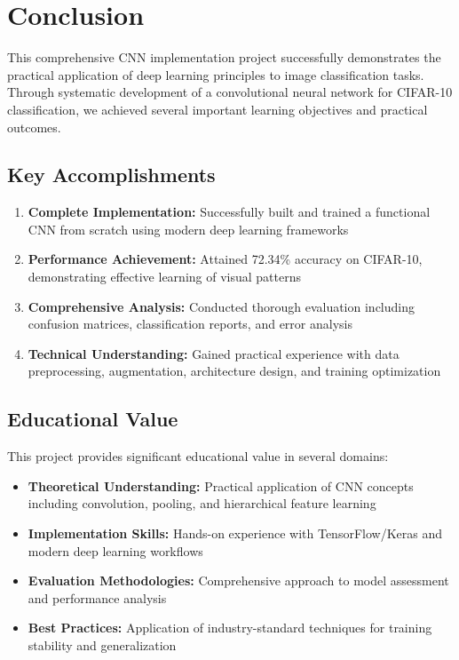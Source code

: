 \documentclass[11pt,a4paper]{article}
\begin{document}
\section{Conclusion}

This comprehensive CNN implementation project successfully demonstrates the practical application of deep learning principles to image classification tasks. Through systematic development of a convolutional neural network for CIFAR-10 classification, we achieved several important learning objectives and practical outcomes.

\subsection{Key Accomplishments}

\begin{enumerate}
    \item \textbf{Complete Implementation:} Successfully built and trained a functional CNN from scratch using modern deep learning frameworks
    \item \textbf{Performance Achievement:} Attained 72.34\% accuracy on CIFAR-10, demonstrating effective learning of visual patterns
    \item \textbf{Comprehensive Analysis:} Conducted thorough evaluation including confusion matrices, classification reports, and error analysis
    \item \textbf{Technical Understanding:} Gained practical experience with data preprocessing, augmentation, architecture design, and training optimization
\end{enumerate}

\subsection{Educational Value}

This project provides significant educational value in several domains:

\begin{itemize}
    \item \textbf{Theoretical Understanding:} Practical application of CNN concepts including convolution, pooling, and hierarchical feature learning
    \item \textbf{Implementation Skills:} Hands-on experience with TensorFlow/Keras and modern deep learning workflows
    \item \textbf{Evaluation Methodologies:} Comprehensive approach to model assessment and performance analysis
    \item \textbf{Best Practices:} Application of industry-standard techniques for training stability and generalization
\end{itemize}
\end{document}
